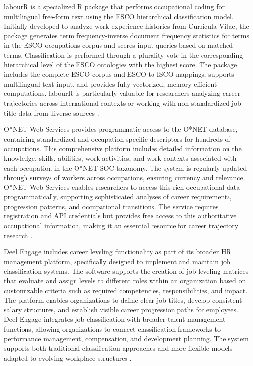 \documentclass[../main.tex]{subfiles}
\begin{document}
labourR is a specialized R package that performs occupational coding for multilingual free-form text using the ESCO hierarchical classification model. Initially developed to analyze work experience histories from Curricula Vitae, the package generates term frequency-inverse document frequency statistics for terms in the ESCO occupations corpus and scores input queries based on matched terms. Classification is performed through a plurality vote in the corresponding hierarchical level of the ESCO ontologies with the highest score. The package includes the complete ESCO corpus and ESCO-to-ISCO mappings, supports multilingual text input, and provides fully vectorized, memory-efficient computations. labourR is particularly valuable for researchers analyzing career trajectories across international contexts or working with non-standardized job title data from diverse sources \parencite{labourr2024}.

O*NET Web Services provides programmatic access to the O*NET database, containing standardized and occupation-specific descriptors for hundreds of occupations. This comprehensive platform includes detailed information on the knowledge, skills, abilities, work activities, and work contexts associated with each occupation in the O*NET-SOC taxonomy. The system is regularly updated through surveys of workers across occupations, ensuring currency and relevance. O*NET Web Services enables researchers to access this rich occupational data programmatically, supporting sophisticated analyses of career requirements, progression patterns, and occupational transitions. The service requires registration and API credentials but provides free access to this authoritative occupational information, making it an essential resource for career trajectory research \parencite{onet2024,onetonline2024}.

Deel Engage includes career leveling functionality as part of its broader HR management platform, specifically designed to implement and maintain job classification systems. The software supports the creation of job leveling matrices that evaluate and assign levels to different roles within an organization based on customizable criteria such as required competencies, responsibilities, and impact. The platform enables organizations to define clear job titles, develop consistent salary structures, and establish visible career progression paths for employees. Deel Engage integrates job classification with broader talent management functions, allowing organizations to connect classification frameworks to performance management, compensation, and development planning. The system supports both traditional classification approaches and more flexible models adapted to evolving workplace structures \parencite{deel2024}.
\end{document}
